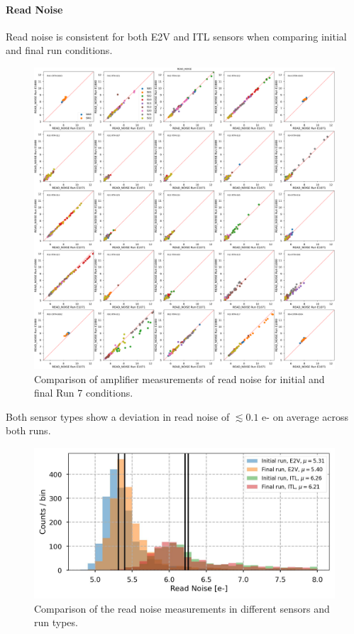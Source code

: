 \clearpage

\paragraph{Read Noise}\label{sec:finalChar:ReadNoise}

Read noise is consistent for both E2V and ITL sensors when comparing initial and final run conditions. 

\begin{figure}[ht]
    \centering
    \includegraphics[width=0.7\linewidth]{figures/finalCharacterization/E1071_E1880_READ_NOISE_inset.png}
    \caption{Comparison of amplifier measurements of read noise for initial and final Run 7 conditions.}
    \label{fig:finalChar-READNoise}
\end{figure}

Both sensor types show a deviation in read noise of $\lesssim 0.1$ e- on average across both runs.

\begin{figure}[ht]
    \centering
    \includegraphics[width=0.7\linewidth]{figures/finalCharacterization/ReadNoiseComp.jpg}
    \caption{Comparison of the read noise measurements in different sensors and run types.}
    \label{fig:finalChar:ReadNoiseByManu}
\end{figure}

